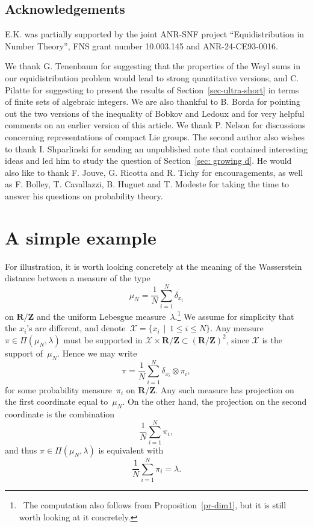 \documentclass[12pt]{amsart}
\renewcommand{\mathcal}{\mathscr}
\renewcommand{\leq}{\leqslant}
\newcommand{\Zz}{\mathbf{Z}}
\newcommand{\Rr}{\mathbf{R}}
\theoremstyle{plain}
\theoremstyle{remark}
\theoremstyle{definition}
\renewcommand{\leq}{\leqslant}
\begin{document}
\subsection*{Acknowledgements}

E.K. was partially supported by the joint ANR-SNF project
``Equi\-distribution in Number Theory'', FNS grant number 10.003.145 and
ANR-24-CE93-0016.

We thank G. Tenenbaum for suggesting that the properties of the Weyl
sums in our equidistribution problem would lead to strong quantitative
versions, and C. Pilatte for suggesting to present the results of
Section~\ref{sec-ultra-short} in terms of finite sets of algebraic
integers. We are also thankful to B. Borda for pointing out the two
versions of the inequality of Bobkov and Ledoux and for very helpful
comments on an earlier version of this article. We thank P. Nelson for
discussions concerning representations of compact Lie groups.  The
second author also wishes to thank I.  Shparlinski for sending an
unpublished note that contained interesting ideas and led him to study
the question of Section~\ref{sec: growing d}. He would also like to
thank F. Jouve, G. Ricotta and R. Tichy for encouragements, as well as
F. Bolley, T.  Cavallazzi, B. Huguet and T. Modeste for taking the time
to answer his questions on probability theory.


\section{A simple example}\label{sec-example}

For illustration, it is worth looking concretely at the meaning of the
Wasserstein distance between a measure of the type
\[
  \mu_N=\frac{1}{N}\sum_{i=1}^N\delta_{x_i}
\]
on $\Rr/\Zz$ and the uniform Lebesgue measure~$\lambda$.\footnote{\ The
  computation also follows from Proposition~\ref{pr-dim1}, but it is
  still worth looking at it concretely.} We assume for simplicity that
the $x_i$'s are different, and
denote~$\mathcal{X}=\{x_i\,\mid\, 1 \leq i \leq N\}$. Any measure
$\pi\in \Pi(\mu_N,\lambda)$ must be supported in
$\mathcal{X}\times \Rr/\Zz\subset (\Rr/\Zz)^2$, since $\mathcal{X}$ is
the support of~$\mu_N$. Hence we may write
\[
  \pi=\frac{1}{N}\sum_{i=1}^N\delta_{x_i}\otimes \pi_i,
\]
for some probability measure~$\pi_i$ on $\Rr/\Zz$. Any such measure
has projection on the first coordinate equal to~$\mu_N$. On the
other hand, the projection on the second coordinate is the combination
\[
  \frac{1}{N}\sum_{i=1}^N\pi_i,
\]
and thus $\pi\in\Pi(\mu_N,\lambda)$ is equivalent with
\[
  \frac{1}{N}\sum_{i=1}^N\pi_i=\lambda.
\]
\end{document}
